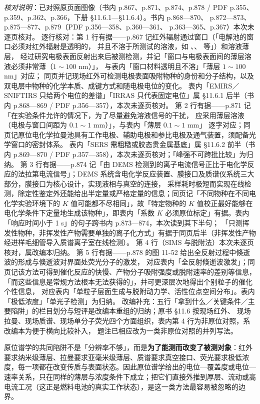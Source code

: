 \emph{核对说明}：已对照原页面图像（书内 p.867、p.871、p.874、p.878 / PDF
p.355、p.359、p.362、p.366，下册 §11.6.1—§11.6.4）。书内 p.868—870、
p.872—873、p.875—877、p.879（PDF p.356—358、p.360—361、
p.363—365、p.367）本次未逐页核对。
逐行核对：第 1 行有据——p.867 记红外辐射通过窗口（「电解池的窗口必须对红外辐射是透明的，
并且不溶于所测试的溶液，如 、、 等」）和溶液薄层，
经过研究电极表面反射出来后被测检测，并记「窗口与电极表面间的薄层溶液必须非常薄（$1\sim100$ nm）」，
与表内「窗口材料透明且不溶」「薄层 $1\sim100$ nm」对应；
同页并记现场红外可检测电极表面吸附物种的身份和分子结构，以及双电层中物种的化学本质、成键方式和随电极电位的变化。
表内「EMIRS／SNIFTIRS 只给两个电位的差谱」「IRRAS 只代表固定电位」属 §11.6.1
后半（书内 p.868—869 / PDF p.356—357），本次未逐页核对。
第 2 行有据——p.871 记「在实验条件允许的情况下，为了尽量避免溶液信号的干扰，
应采用薄层溶液（电极与窗口间距为 $0.1\sim1$ mm）」，与表内「薄层 $0.1\sim1$ mm」
逐字对应；同页记原位电化学拉曼池具有工作电极、辅助电极和参比电极及通气装置，须配备光学窗口的密封体系。
表内「SERS 需粗糙或胶态贵金属基底」属 §11.6.2 前半（书内 p.869—870 / PDF
p.357—358），本次未逐页核对；「峰强不可跨批比较」为归纳。
第 3 行有据——p.874 记「由 DEMS 检测到的离子电流信号正比于电化学反应的法拉第电流信号」；DEMS
系统含电化学反应装置、膜接口及质谱仪系统三大部分，膜接口为核心设计，实现液相与真空的连接，
采样耗时极短而实现在线检测，除定性鉴定外还能给出半定量或严格定量的信息；同页记「不同物种在不同电化学实验环境下的
$K$ 值可能都不尽相同」，故「特定物种的 $K$ 值校正最好能够在电化学条件下定量地生成该物种」，即表内「系数
$K$ 必须原位标定」有据。表内「响应时间小于 1 s」的句子跨书内 p.873—874，本次读到其下半句；
「只测挥发性物种，非挥发性产物需要单独的离子化方式」有据于同页后半（非挥发性产物经进样毛细管导入质谱离子室在线检测）。
第 4 行（SIMS 与脱附法）本次未逐页核对，属改编本归纳。
第 5 行有据——p.878 的图 11-52 给出全反射过程中倏逝波的形成与倏逝波对界面处荧光分子的激发，
对应表内「全反射倏逝波激发」；同页记该方法可得到催化反应的快慢、产物分子吸附强度或脱附速率的差别等信息，
「而这些信息是常规方法根本无法获得的」，并可更深层次地得出个别粒子的催化个性信息，
对应表内「单粒子层面生成与脱附动力学、活性位点空间分布」。表内「极低浓度」「单光子检测」为归纳。
改编补充：五行「拿到什么／关键条件／主要陷阱」的栏目划分与短评是改编本重组的归纳；原书 §11.6 按现场红外、
现场拉曼、现场质谱、现场单分子荧光四个方面组织，表内第 4 行为非原位对照，系改编本为便于横向比较补入，
题注已相应改为一类非原位对照的并列写法。


\begin{pitfall}
 原位谱学的共同陷阱不是「分辨率不够」，而是\textbf{为了能测而改变了被测对象}：红外要求纳米级薄层、拉曼要求亚毫米级薄层、质谱要求真空接口、荧光要求极低浓度，每一项都在改变传质与表面状态。因此原位谱学给出的电位—覆盖度或电位—速率关系，只在同样的薄层与浓度条件下成立；把它们直接外推到厚层、流动或高电流工况（这正是燃料电池的真实工作状态），是这一类方法最容易被忽略的边界。
\end{pitfall}

